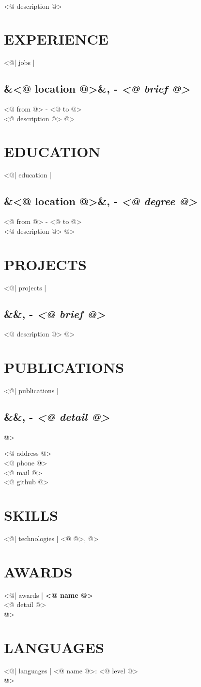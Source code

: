 \documentclass[a4paper,10pt]{scrartcl}
\newcommand{\name}[1]{{\textbf{{\fontsize{30}{30}\selectfont #1}}}}
\newcommand{\heading}[1]{\section*{{\large \uppercase{\textbf{#1}}}}}
\newcommand{\subheading}[3]{\subsection*{{\large #1\textnormal{\ifx&#2&\else, \fi #2 - \textit{#3}}}}}
\newcommand{\timeperiod}[1]{{\small \textcolor{dark}{#1}}\\[3pt]}
\begin{document}
\begin{paracol}{2}

\name{<@ name @>}\\
<@ description @>

\heading{Experience}
<@| jobs |
    \subheading{<@ company @>}{<@ location @>}{<@ brief @>}
    \timeperiod{<@ from @> - <@ to @>}
    <@ description @>
@>

\heading{Education}
<@| education |
    \subheading{<@ name@>}{<@ location @>}{<@ degree @>}
    \timeperiod{<@ from @> - <@ to @>}
    <@ description @>
@>

\heading{Projects}
<@| projects |
    \subheading{<@ name@>}{}{<@ brief @>}
    <@ description @>
@>

\heading{Publications}
<@| publications |
    \subheading{<@ name@>}{}{<@ detail @>}
@>

\switchcolumn
\raggedright

<@ address @>\\
<@ phone @>\\
<@ mail @>\\
<@ github @>\\

\heading{Skills}
<@| technologies | {<@ @>}, @>
\\

\heading{Awards}
<@| awards |
    \textbf{<@ name @>}\\
    <@ detail @>
    \\[5pt]
@>
\heading{Languages}
<@| languages |
    <@ name @>: <@ level @>
    \\
@>

\end{paracol}
\end{document}
